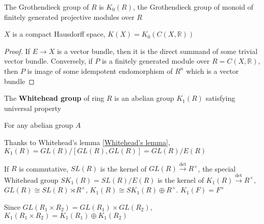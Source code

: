 \documentclass[main]{subfiles}
\begin{document}
\begin{definition}
The Grothendieck group of $R$ is $K_0(R)$, the Grothendieck group of monoid of finitely generated projective modules over $R$
\end{definition}

\begin{theorem}\label{Swan's theorem}
$X$ is a compact Hausdorff space, $K(X)=K_0(C(X,\mathbb R))$
\end{theorem}

\begin{proof}
If $E\to X$ is a vector bundle, then it is the direct summand of some trivial vector bundle. Conversely, if $P$ is a finitely generated module over $R=C(X,\mathbb R)$, then $P$ is image of some idempotent endomorphism of $R^n$ which is a vector bundle
\end{proof}

\begin{definition}
The \textbf{Whitehead group} of ring $R$ is an abelian group $K_1(R)$ satisfying universal property
\begin{center}
\end{center}
For any abelian group $A$
\end{definition}

\begin{construction}
Thanks to Whitehead's lemma \ref{Whitehead's lemma}, $K_1(R)=GL(R)/[GL(R),GL(R)]=GL(R)/E(R)$
\end{construction}

\begin{definition}
If $R$ is commutative, $SL(R)$ is the kernel of $GL(R)\xrightarrow{\det}R^\times$, the special Whitehead group $SK_1(R)=SL(R)/E(R)$ is the kernel of $K_1(R)\xrightarrow{\det}R^\times$, $GL(R)\cong SL(R)\rtimes R^\times$, $K_1(R)\cong SK_1(R)\oplus R^\times$. $K_1(F)=F^\times$
\end{definition}

\begin{lemma}
Since $GL(R_1\times R_2)=GL(R_1)\times GL(R_2)$, $K_1(R_1\times R_2)=K_1(R_1)\oplus K_1(R_2)$
\end{lemma}
\end{document}
